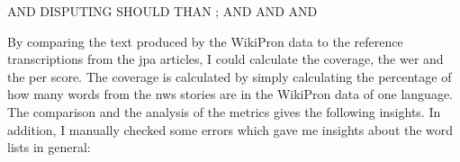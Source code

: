 \begin{covexamples}
\item \label{ex:english-coverage-text}  AND  DISPUTING  SHOULD  THAN ; AND  AND  AND 
\end{covexamples}

By comparing the text produced by the WikiPron data to the reference transcriptions from the \ac{jpa} articles, I could calculate the coverage, the \ac{wer} and the \ac{per} score. The coverage is calculated by simply calculating the percentage of how many words from the \ac{nws} stories are in the WikiPron data of one language. The comparison and the analysis of the metrics gives the following insights. In addition, I manually checked some errors which gave me insights about the word lists in general:

